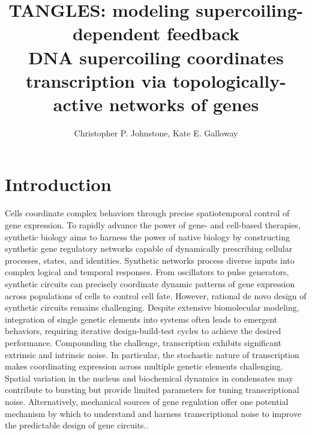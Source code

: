 \documentclass[11pt]{article}
\title{TANGLES: modeling supercoiling-dependent feedback\\DNA supercoiling coordinates transcription via topologically-active networks of genes }
\author{Christopher P. Johnstone, Kate E. Galloway}
\date{ }
\begin{document}
\maketitle

\section{Introduction}
Cells coordinate complex behaviors through precise spatiotemporal control of gene expression. To rapidly advance the power of gene- and cell-based therapies, synthetic biology aims to harness the power of native biology by constructing synthetic gene regulatory networks capable of dynamically prescribing cellular processes, states, and identities.\parencite{chenSyntheticBiologyAdvancing2012,beitzSyntheticGeneCircuits2022,purnickSecondWaveSynthetic2009,elowitzBuildLifeUnderstand2010}
Synthetic networks process diverse inputs into complex logical and temporal responses.\parencite{weinbergLargescaleDesignRobust2017,xieMultiInputRNAiBasedLogic2011,taborSyntheticGeneticEdge2009}
From oscillators to pulse generators, synthetic circuits can  precisely coordinate dynamic patterns of gene expression across populations of cells to control cell fate.\parencite{gardnerConstructionGeneticToggle2000,elowitzSyntheticOscillatoryNetwork2000,strickerFastRobustTunable2008,daninoSynchronizedQuorumGenetic2010,maSyntheticMammalianSignaling2020a,parkEngineeringEpigeneticRegulation2019,bashorUsingEngineeredScaffold2008,gallowayDynamicallyReshapingSignaling2013}
However, rational de novo design of synthetic circuits remains challenging. Despite extensive biomolecular modeling, integration of single genetic elements into systems often leads to emergent behaviors, requiring iterative design-build-test cycles to achieve the desired performance.\parencite{jonesEndoribonucleasebasedFeedforwardController2020,freiCharacterizationMitigationGene2020,qianResourceCompetitionShapes2017}
Compounding the challenge, transcription exhibits significant extrinsic and intrinsic noise.\parencite{toNoiseCanInduce2010,zopfCellCycleDependenceTranscription2013,desaiDNArepairPathwayCan2021}
In particular, the stochastic nature of transcription makes coordinating expression across multiple genetic elements challenging.\parencite{rodriguezIntrinsicDynamicsHuman2019,rodriguezTranscriptionLivingCells2020,quartonUncouplingGeneExpression2020}
Spatial variation in the nucleus and biochemical dynamics in condensates may contribute to bursting but provide limited parameters for tuning transcriptional noise.\parencite{henningerRNAMediatedFeedbackControl2020,guoPolIIPhosphorylation2019}
Alternatively, mechanical sources of gene regulation offer one potential mechanism by which to understand and harness transcriptional noise to improve the predictable design of gene circuits.\parencite{johnstoneEngineeringCellularSymphonies2021,anconaTranscriptionalBurstsNonequilibrium2019a,kimLongDistanceCooperativeAntagonistic2019,elhoudaiguiBacterialGenomeArchitecture2019a,meyerTorsionMediatedInteractionAdjacent2014}.
\end{document}

